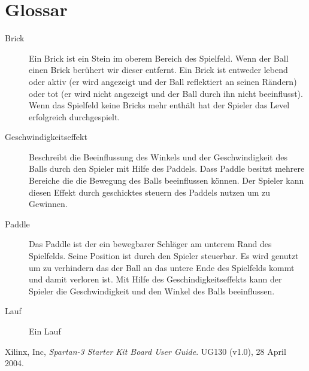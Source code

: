 \documentclass{scrartcl}
\begin{document}
\section{Glossar}
\begin{description}
\item[Brick] Ein Brick ist ein Stein im oberem Bereich des Spielfeld. Wenn der
Ball einen Brick berühert wir dieser entfernt. Ein Brick ist entweder
lebend oder aktiv (er wird angezeigt und der Ball reflektiert an seinen
Rändern) oder tot (er wird nicht angezeigt und der Ball durch ihn nicht
beeinflusst).
Wenn das Spielfeld keine Bricks mehr enthält hat der Spieler das Level erfolgreich durchgespielt.
\item[Geschwindigkeitseffekt] Beschreibt die Beeinflussung des Winkels und der
Geschwindigkeit des Balls durch den Spieler mit Hilfe des Paddels. Dass Paddle
besitzt mehrere Bereiche die die Bewegung des Balls beeinflussen können. Der
Spieler kann diesen Effekt durch geschicktes steuern des Paddels nutzen um zu
Gewinnen.
\item[Paddle] Das Paddle ist der ein bewegbarer Schläger am unterem Rand des
Spielfelds. Seine Position ist durch den Spieler steuerbar. Es wird genutzt um
zu verhindern das der Ball an das untere Ende des Spielfelds kommt und damit
verloren ist. Mit Hilfe des Geschindigkeitseffekts kann der Spieler die
Geschwindigkeit und den Winkel des Balls beeinflussen.
\item[Lauf] Ein Lauf
\end{description}

\listoffigures

\begin{thebibliography}{9}

  Xilinx, Inc,
  \emph{Spartan-3 Starter Kit Board User Guide}.
  UG130 (v1.0),
  28 April 2004.

\end{thebibliography}
\end{document}
